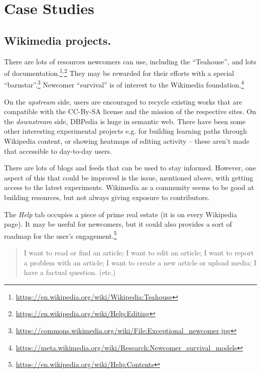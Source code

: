 \section{Case Studies}\label{sec:Case Studies}

\subsection{Wikimedia projects.}

 There are lots of resources newcomers can use, including
the ``Teahouse'', and lots of documentation.\footnote{\url{https://en.wikipedia.org/wiki/Wikipedia:Teahouse}}\textsuperscript{,}\footnote{\url{https://en.wikipedia.org/wiki/Help:Editing}}  They may be rewarded for their efforts with a special ``barnstar''.\footnote{\url{https://commons.wikimedia.org/wiki/File:Exceptional_newcomer.jpg}}
Newcomer ``survival'' is of interest to the Wikimedia foundation.\footnote{\url{https://meta.wikimedia.org/wiki/Research:Newcomer_survival_models}}


 On the \emph{upstream} side,
users are encouraged to recycle existing works that are compatible
with the CC-By-SA license and the mission of the respective sites.  On
the \emph{downstream} side, DBPedia is huge in semantic web.  There
have been some other interesting experimental projects e.g. for
building learning paths through Wikipedia content, or showing heatmaps
of editing activity -- these aren't made that accessible to day-to-day
users.

 There are lots of blogs and feeds that can be
used to stay informed.  However, one aspect of this that could be
improved is the issue, mentioned above, with getting access to the
latest experiments.  Wikimedia as a community seems to be good at
building resources, but not always giving exposure to contributors.

 The \emph{Help} tab occupies a piece of prime
real estate (it is on every Wikipedia page).  It may be useful for
newcomers, but it could also provides a sort of roadmap for the user's
engagement.\footnote{\url{https://en.wikipedia.org/wiki/Help:Contents}}

\begin{quotation}
\noindent 
I want to read or find an article;
I want to edit an article;
I want to report a problem with an article;
I want to create a new article or upload media;
I have a factual question.
(etc.)
\end{quotation}

